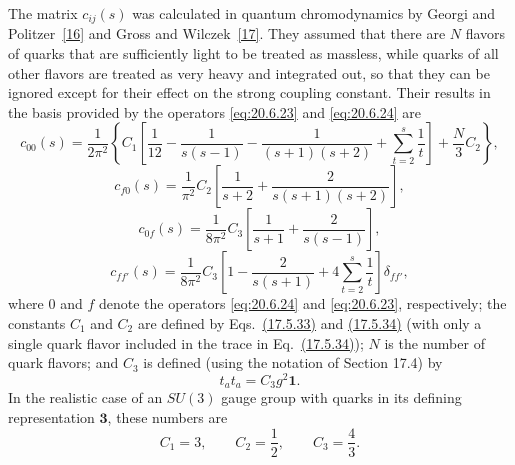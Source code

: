 The matrix $c_{ij}(s)$ was calculated in quantum chromodynamics by Georgi and Politzer~\hyperref[ch20-ref-16]{[16]} and Gross and Wilczek~\hyperref[ch20-ref-17]{[17]}. They assumed that there are $N$ flavors of quarks that are sufficiently light to be treated as massless, while quarks of all other flavors are treated as very heavy and integrated out, so that they can be ignored except for their effect on the strong coupling constant. Their results in the basis provided by the operators \eqref{eq:20.6.23} and \eqref{eq:20.6.24} are
\begin{equation}
c_{00}(s)
=\frac{1}{2\pi^2}
\left\{
C_1\left[
\frac1{12}
-\frac{1}{s(s-1)}
-\frac{1}{(s+1)(s+2)}
+\sum_{t=2}^s\frac1t
\right]
+\frac N3C_2
\right\},
\tag{20.6.47}\label{eq:20.6.47}
\end{equation}
\begin{equation}
c_{f0}(s)
=\frac{1}{\pi^2}C_2
\left[
\frac{1}{s+2}
+\frac{2}{s(s+1)(s+2)}
\right],
\tag{20.6.48}\label{eq:20.6.48}
\end{equation}
\begin{equation}
c_{0f}(s)
=\frac{1}{8\pi^2}C_3
\left[
\frac{1}{s+1}
+\frac{2}{s(s-1)}
\right],
\tag{20.6.49}\label{eq:20.6.49}
\end{equation}
\begin{equation}
c_{ff'}(s)
=\frac{1}{8\pi^2}C_3
\left[
1-\frac{2}{s(s+1)}
+4\sum_{t=2}^s\frac1t
\right]\delta_{ff'},
\tag{20.6.50}\label{eq:20.6.50}
\end{equation}
where $0$ and $f$ denote the operators \eqref{eq:20.6.24} and \eqref{eq:20.6.23}, respectively; the constants $C_1$ and $C_2$ are defined by Eqs.~\hyperref[eq:17.5.33]{(17.5.33)} and \hyperref[eq:17.5.34]{(17.5.34)} (with only a single quark flavor included in the trace in Eq.~\hyperref[eq:17.5.34]{(17.5.34)}); $N$ is the number of quark flavors; and $C_3$ is defined (using the notation of Section 17.4) by
\begin{equation}
t_a t_a=C_3g^2\mathbf{1}.
\tag{20.6.51}\label{eq:20.6.51}
\end{equation}
In the realistic case of an $SU(3)$ gauge group with quarks in its defining representation $\mathbf3$, these numbers are
\begin{equation}
C_1=3,
\qquad
C_2=\frac12,
\qquad
C_3=\frac43.
\tag{20.6.52}\label{eq:20.6.52}
\end{equation}

